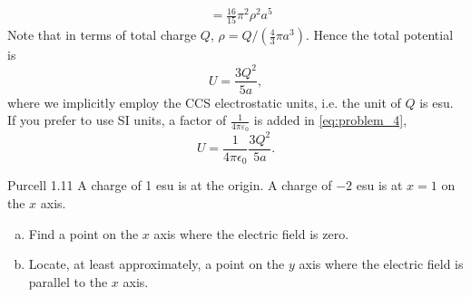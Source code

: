 \documentclass{esg8022pset}
\begin{document}
\begin{solution}
\begin{align*}
             & = \frac{16}{15}\pi^2 \rho^2 a^5
  \end{align*}
  Note that in terms of total charge $Q$, $\rho = Q / (\frac43 \pi a^3)$. Hence the total potential is
  \begin{equation}\label{eq:problem_4}
    U = \frac{3Q^2}{5a},
  \end{equation}
  where we implicitly employ the CCS electrostatic units, i.e. the unit of $Q$ is esu. If you prefer to use SI units, a factor of $\frac{1}{4\pi \varepsilon_0}$ is added in \autoref{eq:problem_4},
  $$U = \frac{1}{4\pi \epsilon_0} \frac{3Q^2}{5a}.$$
\end{solution}





\begin{problem}{Purcell 1.11}
  A charge of 1 esu is at the origin. A charge of $-2$ esu is at $x = 1$ on the $x$ axis.
  \begin{enumerate}[(a)]
    \item Find a point on the $x$ axis where the electric field is zero. 
    \item Locate, at least approximately, a point on the $y$ axis where the electric field is parallel to the $x$ axis.
  \end{enumerate}
\end{problem}
\end{document}
